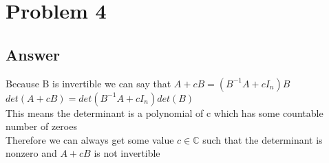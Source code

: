 \documentclass{article}
\begin{document}
\section*{Problem 4}
\subsection*{Answer}
Because B is invertible we can say that \(A + cB = (B^{-1}A + cI_{n})B\)\\
\(det(A + cB) = det(B^{-1}A + cI_{n})det(B)\) \\
This means the determinant is a polynomial of c which has some countable number of zeroes \\
Therefore we can always get some value \(c \in \mathbb{C}\) such that the determinant is nonzero and \(A + cB\) is not invertible\\
\end{document}
